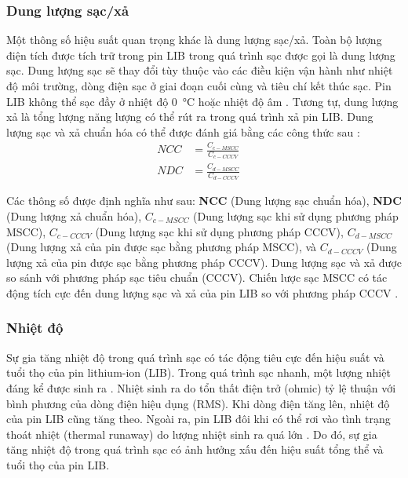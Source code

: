 \documentclass{thesis}
\begin{document}
\subsubsection{Dung lượng sạc/xả}

Một thông số hiệu suất quan trọng khác là dung lượng sạc/xả. Toàn bộ lượng điện tích được tích trữ trong pin LIB trong quá trình sạc được gọi là dung lượng sạc. Dung lượng sạc sẽ thay đổi tùy thuộc vào các điều kiện vận hành như nhiệt độ môi trường, dòng điện sạc ở giai đoạn cuối cùng và tiêu chí kết thúc sạc. Pin LIB không thể sạc đầy ở nhiệt độ \SI{0}{\degreeCelsius} hoặc nhiệt độ âm \cite{ref60}. Tương tự, dung lượng xả là tổng lượng năng lượng có thể rút ra trong quá trình xả pin LIB. Dung lượng sạc và xả chuẩn hóa có thể được đánh giá bằng các công thức sau \cite{ref51}:
\begin{align}
NCC &= \frac{C_{c-MSCC}}{C_{c-CCCV}} \quad  \label{eq:ncc} \\
NDC &= \frac{C_{d-MSCC}}{C_{d-CCCV}} \quad  \label{eq:ndc}
\end{align}

Các thông số được định nghĩa như sau: \textbf{NCC} (Dung lượng sạc chuẩn hóa), \textbf{NDC} (Dung lượng xả chuẩn hóa), $C_{c-MSCC}$ (Dung lượng sạc khi sử dụng phương pháp MSCC), $C_{c-CCCV}$ (Dung lượng sạc khi sử dụng phương pháp CCCV), $C_{d-MSCC}$ (Dung lượng xả của pin được sạc bằng phương pháp MSCC), và $C_{d-CCCV}$ (Dung lượng xả của pin được sạc bằng phương pháp CCCV). Dung lượng sạc và xả được so sánh với phương pháp sạc tiêu chuẩn (CCCV). Chiến lược sạc MSCC có tác động tích cực đến dung lượng sạc và xả của pin LIB so với phương pháp CCCV \cite{ref51,ref55,ref60}.

\subsubsection{Nhiệt độ}


Sự gia tăng nhiệt độ trong quá trình sạc có tác động tiêu cực đến hiệu suất và tuổi thọ của pin lithium-ion (LIB). Trong quá trình sạc nhanh, một lượng nhiệt đáng kể được sinh ra \cite{ref40,ref77}. Nhiệt sinh ra do tổn thất điện trở (ohmic) tỷ lệ thuận với bình phương của dòng điện hiệu dụng (RMS). Khi dòng điện tăng lên, nhiệt độ của pin LIB cũng tăng theo. Ngoài ra, pin LIB đôi khi có thể rơi vào tình trạng thoát nhiệt (thermal runaway) do lượng nhiệt sinh ra quá lớn \cite{ref78,ref79}. Do đó, sự gia tăng nhiệt độ trong quá trình sạc có ảnh hưởng xấu đến hiệu suất tổng thể và tuổi thọ của pin LIB.
\end{document}
